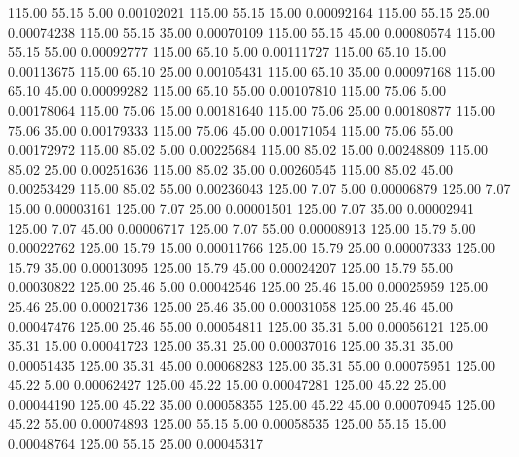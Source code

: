     115.00     55.15      5.00     0.00102021
    115.00     55.15     15.00     0.00092164
    115.00     55.15     25.00     0.00074238
    115.00     55.15     35.00     0.00070109
    115.00     55.15     45.00     0.00080574
    115.00     55.15     55.00     0.00092777
    115.00     65.10      5.00     0.00111727
    115.00     65.10     15.00     0.00113675
    115.00     65.10     25.00     0.00105431
    115.00     65.10     35.00     0.00097168
    115.00     65.10     45.00     0.00099282
    115.00     65.10     55.00     0.00107810
    115.00     75.06      5.00     0.00178064
    115.00     75.06     15.00     0.00181640
    115.00     75.06     25.00     0.00180877
    115.00     75.06     35.00     0.00179333
    115.00     75.06     45.00     0.00171054
    115.00     75.06     55.00     0.00172972
    115.00     85.02      5.00     0.00225684
    115.00     85.02     15.00     0.00248809
    115.00     85.02     25.00     0.00251636
    115.00     85.02     35.00     0.00260545
    115.00     85.02     45.00     0.00253429
    115.00     85.02     55.00     0.00236043
    125.00      7.07      5.00     0.00006879
    125.00      7.07     15.00     0.00003161
    125.00      7.07     25.00     0.00001501
    125.00      7.07     35.00     0.00002941
    125.00      7.07     45.00     0.00006717
    125.00      7.07     55.00     0.00008913
    125.00     15.79      5.00     0.00022762
    125.00     15.79     15.00     0.00011766
    125.00     15.79     25.00     0.00007333
    125.00     15.79     35.00     0.00013095
    125.00     15.79     45.00     0.00024207
    125.00     15.79     55.00     0.00030822
    125.00     25.46      5.00     0.00042546
    125.00     25.46     15.00     0.00025959
    125.00     25.46     25.00     0.00021736
    125.00     25.46     35.00     0.00031058
    125.00     25.46     45.00     0.00047476
    125.00     25.46     55.00     0.00054811
    125.00     35.31      5.00     0.00056121
    125.00     35.31     15.00     0.00041723
    125.00     35.31     25.00     0.00037016
    125.00     35.31     35.00     0.00051435
    125.00     35.31     45.00     0.00068283
    125.00     35.31     55.00     0.00075951
    125.00     45.22      5.00     0.00062427
    125.00     45.22     15.00     0.00047281
    125.00     45.22     25.00     0.00044190
    125.00     45.22     35.00     0.00058355
    125.00     45.22     45.00     0.00070945
    125.00     45.22     55.00     0.00074893
    125.00     55.15      5.00     0.00058535
    125.00     55.15     15.00     0.00048764
    125.00     55.15     25.00     0.00045317
